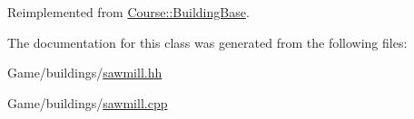 Reimplemented from \hyperlink{classCourse_1_1BuildingBase_ac2cc44e08dc73d05b1617bf71295baaf}{Course\-::\-Building\-Base}.



The documentation for this class was generated from the following files\-:\begin{DoxyCompactItemize}
\item 
Game/buildings/\hyperlink{sawmill_8hh}{sawmill.\-hh}\item 
Game/buildings/\hyperlink{sawmill_8cpp}{sawmill.\-cpp}\end{DoxyCompactItemize}

